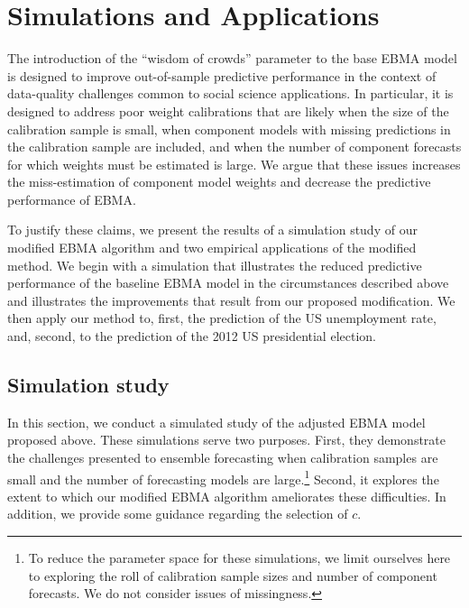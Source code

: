 \documentclass[12pt,fullpage,endnotes]{article}
\begin{document}
\section{Simulations and Applications}
\label{empirics}

The introduction of the ``wisdom of crowds'' parameter to the base
EBMA model is designed to improve out-of-sample predictive performance
in the context of data-quality challenges common to social science
applications. In particular, it is designed to address poor weight
calibrations that are likely when the size of the calibration sample
is small, when component models with missing predictions in the calibration sample are included, and
when the number of component forecasts for which weights must be estimated
is large.  We argue that these issues increases the miss-estimation of
component model weights and decrease the predictive performance of
EBMA.

To justify these claims, we present the results of a
simulation study of our modified EBMA algorithm and two empirical
applications of the modified method. We begin with a simulation that
illustrates the reduced predictive performance of the baseline EBMA
model in the circumstances described above and illustrates the
improvements that result from our proposed modification.  We then
apply our method to, first, the prediction of the US unemployment
rate, and, second, to the prediction of the 2012 US presidential
election.

\subsection{Simulation study} 

In this section, we conduct a simulated study of the adjusted EBMA
model proposed above.  These simulations serve two purposes.  First,
they demonstrate the challenges presented to ensemble forecasting when
calibration samples are small and the number of forecasting models are
large.\footnote{To reduce the parameter space for these simulations,
  we limit ourselves here to exploring the roll of calibration sample
  sizes and number of component forecasts.  We do not consider issues
  of missingness.}  Second, it explores the extent to which our
modified EBMA algorithm ameliorates these difficulties.  In addition,
we provide some guidance regarding the selection of $c$.
\end{document}
